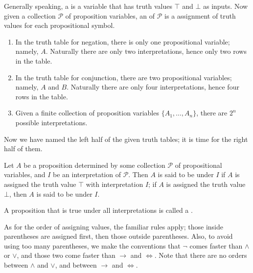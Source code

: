 \begin{definition}[Interpretation]
    \label{def:interpret}    
    Generally speaking,
    a 
    is a variable that has
    truth values \(\top\) and \(\bot\) as inputs.
    Now given a collection \(\mathcal P\) of proposition variables,
    an  of \(\mathcal P\)
    is a assignment of truth values for each propositional symbol.
\end{definition}

\begin{example}
    \begin{enumerate}[label=(\alph*)]
        \item In the truth table for negation,
        there is only one propositional variable; namely, \(A\).
        Naturally there are only two interpretations,
        hence only two rows in the table.

        \item In the truth table for conjunction,
        there are two propositional variables; namely, \(A\) and \(B\).
        Naturally there are only four interpretations,
        hence four rows in the table.

        \item Given a finite collection of proposition variables
        \(\{A_1,\dots,A_n\}\),
        there are \(2^n\) possible interpretations.
    \end{enumerate}
\end{example}

Now we have named the left half of the given truth tables;
it is time for the right half of them.

\begin{definition}
    \label{def:truth}
    Let \(A\) be a proposition
    determined by some collection \(\mathcal P\)
    of propositional variables,
    and \(I\) be an interpretation of \(\mathcal P\).
    Then \(A\) is said to be  under \(I\)
    if \(A\) is assigned the truth value \(\top\)
    with interpretation \(I\);
    if \(A\) is assigned the truth value \(\bot\),
    then \(A\) is said to be  under \(I\).

    A proposition that is true under all interpretations
    is called a .
\end{definition}

As for the order of assigning values, the familiar rules apply;
those inside parentheses are assigned first,
then those outside parentheses.
Also, to avoid using too many parentheses,
we make the conventions that
\(\neg\) comes faster than \(\wedge\) or \(\vee\),
and those two come faster than \(\to\) and \(\iff\).
Note that
there are no orders between \(\wedge\) and \(\vee\),
and between \(\to\) and \(\iff\).

